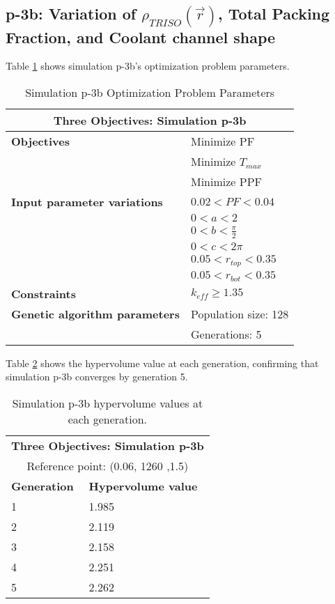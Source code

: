 \subsection{p-3b: Variation of $\rho_{TRISO}(\vec{r})$, Total Packing Fraction, and Coolant channel shape}
Table \ref{tab:simulationp3b} shows simulation p-3b's optimization problem parameters. 
\begin{table}[htbp!]
    \centering
    \onehalfspacing
    \caption{Simulation p-3b Optimization Problem Parameters}
	\label{tab:simulationp3b}
    \footnotesize
    \begin{tabular}{l|p{4cm}}
    \hline 
    \multicolumn{2}{c}{\textbf{Three Objectives: Simulation p-3b}} \\
    \hline 
    \textbf{Objectives} & Minimize PF \\
    & Minimize $T_{max}$ \\
    & Minimize PPF \\
    \hline 
    \textbf{Input parameter variations} & $0.02<PF<0.04$ \\
    & $0<a<2$ \\
    & $0<b<\frac{\pi}{2}$ \\
    & $0<c<2\pi$ \\
    & $0.05<r_{top}<0.35$ \\
    & $0.05<r_{bot}<0.35$ \\
    \hline
    \textbf{Constraints} & $k_{eff} \geq 1.35$\\ 
    \hline 
    \textbf{Genetic algorithm parameters} & Population size: 128 \\
    & Generations: 5 \\
    \hline
    \end{tabular}
\end{table}

Table \ref{tab:p3b-hypervolume} shows the hypervolume value at each generation, 
confirming that simulation p-3b converges by generation 5. 
\begin{table}[htbp!]
    \centering
    \onehalfspacing
    \caption{Simulation p-3b hypervolume values at each generation.}
	\label{tab:p3b-hypervolume}
    \footnotesize
    \begin{tabular}{ll}
    \hline 
    \multicolumn{2}{c}{\textbf{Three Objectives: Simulation p-3b}} \\
    \multicolumn{2}{c}{Reference point: (0.06, 1260 ,1.5)} \\
    \hline 
    \textbf{Generation} & \textbf{Hypervolume value} \\
    \hline
    1 & 1.985 \\
    2 & 2.119 \\
    3 & 2.158 \\
    4 & 2.251\\
    5 & 2.262 \\
    \hline
    \end{tabular}
\end{table}

